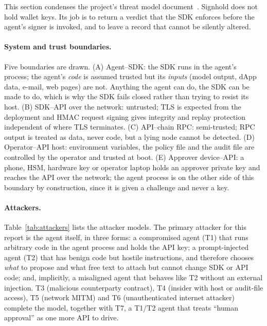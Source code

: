 \documentclass[10pt]{article}
\begin{document}
This section condenses the project's threat model document~\cite{threatmodel}. Signhold does not hold wallet keys. Its job is to return a verdict that the SDK enforces before the agent's signer is invoked, and to leave a record that cannot be silently altered.

\paragraph{System and trust boundaries.} Five boundaries are drawn. (A) Agent--SDK: the SDK runs in the agent's process; the agent's \emph{code} is assumed trusted but its \emph{inputs} (model output, dApp data, e-mail, web pages) are not. Anything the agent can do, the SDK can be made to do, which is why the SDK fails closed rather than trying to resist its host. (B) SDK--API over the network: untrusted; TLS is expected from the deployment and HMAC request signing gives integrity and replay protection independent of where TLS terminates. (C) API--chain RPC: semi-trusted; RPC output is treated as data, never code, but a lying node cannot be detected. (D) Operator--API host: environment variables, the policy file and the audit file are controlled by the operator and trusted at boot. (E) Approver device--API: a phone, HSM, hardware key or operator laptop holds an approver private key and reaches the API over the network; the agent process is on the other side of this boundary by construction, since it is given a challenge and never a key.

\paragraph{Attackers.} Table~\ref{tab:attackers} lists the attacker models. The primary attacker for this report is the agent itself, in three forms: a compromised agent (T1) that runs arbitrary code in the agent process and holds the API key; a prompt-injected agent (T2) that has benign code but hostile instructions, and therefore chooses \emph{what} to propose and what free text to attach but cannot change SDK or API code; and, implicitly, a misaligned agent that behaves like T2 without an external injection. T3 (malicious counterparty contract), T4 (insider with host or audit-file access), T5 (network MITM) and T6 (unauthenticated internet attacker) complete the model, together with T7, a T1/T2 agent that treats ``human approval'' as one more API to drive.
\end{document}
